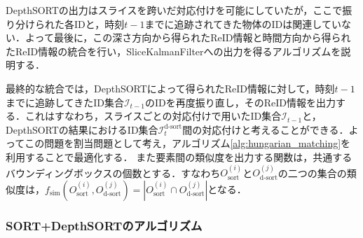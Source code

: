         DepthSORTの出力はスライスを跨いだ対応付けを可能にしていたが，ここで振り分けられた各IDと，時刻$t-1$までに追跡されてきた物体のIDは関連していない．よって最後に，この深さ方向から得られたReID情報と時間方向から得られたReID情報の統合を行い，SliceKalmanFilterへの出力を得るアルゴリズムを説明する．

        最終的な統合では，DepthSORTによって得られたReID情報に対して，時刻$t-1$までに追跡してきたID集合$\mathcal{I}_{t-1}$のIDを再度振り直し，そのReID情報を出力する．これはすなわち，スライスごとの対応付けで用いたID集合$\mathcal{I}_{t-1}$と，DepthSORTの結果におけるID集合$\mathcal{I}_t^{\text{d-sort}}$間の対応付けと考えることができる．よってこの問題を割当問題として考え，アルゴリズム\ref{alg:hungarian_matching}を利用することで最適化する．
        また要素間の類似度を出力する関数は，共通するバウンディングボックスの個数とする．すなわち$O_{\text{sort}}^{(i)}$と$O_{\text{d-sort}}^{(j)}$の二つの集合の類似度は，$f_{\text{sim}}(O_{\text{sort}}^{(i)}, O_{\text{d-sort}}^{(j)}) = \left| O_{\text{sort}}^{(i)}\cap O_{\text{d-sort}}^{(j)}\right|$となる．
        
        \subsubsection{SORT+DepthSORTのアルゴリズム}

